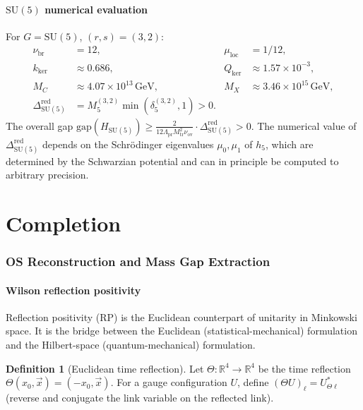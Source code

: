\documentclass[12pt]{article}
\theoremstyle{plain}
\theoremstyle{definition}
\newtheorem{definition}[theorem]{Definition}
\numberwithin{equation}{section}
\newcommand{\R}{\mathbb{R}}
\newcommand{\pr}{\mathrm{pr}}
\newcommand{\loc}{\mathrm{loc}}
\newcommand{\red}{\mathrm{red}}
\newcommand{\br}{\mathrm{br}}
\newcommand{\ov}{\mathrm{ov}}
\newcommand{\tr}{\mathrm{tr}}
\newcommand{\kker}{\mathrm{ker}}
\begin{document}
\subsection{$\mathrm{SU}(5)$ numerical evaluation}

For $G=\mathrm{SU}(5)$, $(r,s)=(3,2)$:
\begin{align}
\nu_{\br} &= 12, & \mu_{\loc} &= 1/12,\\
k_{\kker} &\approx 0.686, & Q_{\kker} &\approx 1.57\times 10^{-3},\\
M_C &\approx 4.07\times 10^{13}\,\mathrm{GeV}, & M_X &\approx 3.46\times 10^{15}\,\mathrm{GeV},\\
\Delta_{\mathrm{SU}(5)}^{\red} &= M_5^{(3,2)}\min(\delta_5^{(3,2)},1) > 0.
\end{align}
The overall gap $\mathrm{gap}(H_{\mathrm{SU}(5)})\geq\frac{2}{12\Lambda_{\pr}M_{\tr}^2\nu_{\ov}}\cdot\Delta_{\mathrm{SU}(5)}^{\red}>0$.  The numerical value of $\Delta_{\mathrm{SU}(5)}^{\red}$ depends on the Schr\"odinger eigenvalues $\mu_0,\mu_1$ of $h_5$, which are determined by the Schwarzian potential and can in principle be computed to arbitrary precision.



\part{Completion}

\section{OS Reconstruction and Mass Gap Extraction}\label{sec:OS}

\subsection{Wilson reflection positivity}

Reflection positivity (RP) is the Euclidean counterpart of unitarity in Minkowski space.  It is the bridge between the Euclidean (statistical-mechanical) formulation and the Hilbert-space (quantum-mechanical) formulation.

\begin{definition}[Euclidean time reflection]
Let $\Theta:\R^4\to\R^4$ be the time reflection $\Theta(x_0,\vec{x})=(-x_0,\vec{x})$.  For a gauge configuration $U$, define $(\Theta U)_\ell=U_{\Theta\ell}^*$ (reverse and conjugate the link variable on the reflected link).
\end{definition}
\end{document}
